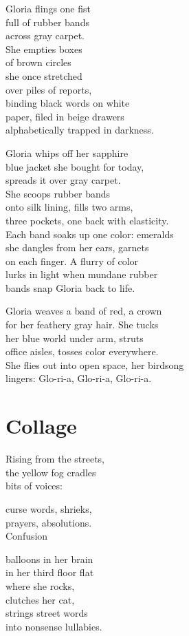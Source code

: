 \documentclass[twoside,10pt]{book}
\begin{document}
Gloria flings one fist\\
full of rubber bands\\
across gray carpet.\\
She empties boxes\\
of brown circles\\
she once stretched\\
over piles of reports,\\
binding black words on white\\
paper, filed in beige drawers\\
alphabetically trapped in darkness.

Gloria whips off her sapphire\\
blue jacket she bought for today,\\
spreads it over gray carpet.\\
She scoops rubber bands\\
onto silk lining, fills two arms,\\
three pockets, one back with elasticity.\\
Each band soaks up one color: emeralds\\
she dangles from her ears, garnets\\
on each finger. A flurry of color\\
lurks in light when mundane rubber\\
bands snap Gloria back to life.

Gloria weaves a band of red, a crown\\
for her feathery gray hair. She tucks\\
her blue world under arm, struts\\
office aisles, tosses color everywhere.\\
She flies out into open space, her birdsong\\
lingers: Glo-ri-a, Glo-ri-a, Glo-ri-a.


\clearpage
\section{Collage}

Rising from the streets,\\
the yellow fog cradles\\
bits of voices:

curse words, shrieks,\\
prayers, absolutions.\\
Confusion

balloons in her brain\\
in her third floor flat\\
where she rocks,\\
clutches her cat,\\
strings street words\\
into nonsense lullabies.
\end{document}

